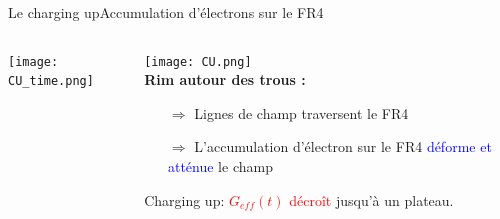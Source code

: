     \begin{frame}{Le charging up}{Accumulation d'électrons sur le FR4}
        \begin{scriptsize}
            \begin{columns}
       			\begin{column}{0.5\textwidth}
           			\texttt{[image: CU\_time.png]}
       			\end{column}\hfill
       			\begin{column}{0.5\textwidth}
       				\texttt{[image: CU.png]}\\\vspace{1cm}
           			\textbf{Rim autour des trous :}
       				\begin{itemize}
       					\item[$\Rightarrow$] Lignes de champ traversent le FR4\\
       					\item[$\Rightarrow$] L'accumulation d'électron sur le FR4 \textcolor{blue}{déforme et atténue} le champ
       				\end{itemize}
       				Charging up: \textcolor{red}{$G_{eff}(t)$ décroît} jusqu'à un plateau.
           		\end{column}
           	\end{columns}
        \end{scriptsize}
    \end{frame}
        
